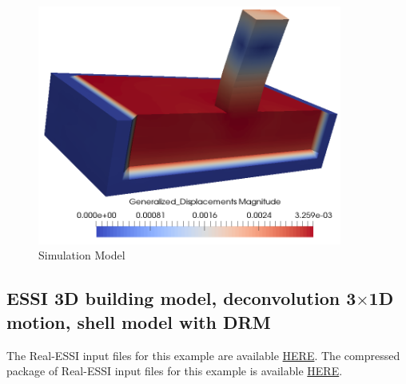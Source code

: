 \begin{figure}[H]
  \centering
  \includegraphics[width = 10cm]{./Figure-files/Day2/Deconvolution_3by1D_Motions/Earthquake_Soil-Structure_Interaction_3D_Model_with_DRM/DRM3D_motion3D_structure.png}
  \caption{Simulation Model}
  \label{fig_decon_3D_motion_3D_model_results_structure}
\end{figure}





\clearpage
\newpage
\subsection{ESSI 3D building model, deconvolution  3$\times$1D motion, shell model with DRM}
\label{Earthquake_Soil-Structure_Interaction_3D_Model_with_DRM4}

The Real-ESSI input files for this example are available 
\href{https://github.com/yuan-energy/Real-ESSI-Short-Course-Examples/tree/master/short-course-examples/Day2/Deconvolution_3by1D_Motions/Shell_Structure_Soil_Interaction_3D_DRM}{HERE}. 
The compressed package of Real-ESSI input files for this example is available 
\href{https://github.com/yuan-energy/Real-ESSI-Short-Course-Examples/blob/master/short-course-examples/Day2/Deconvolution_3by1D_Motions/Shell_Structure_Soil_Interaction_3D_DRM/Shell_Structure_Soil_Interaction_3D_DRM.tgz?raw=true}{HERE}. 

